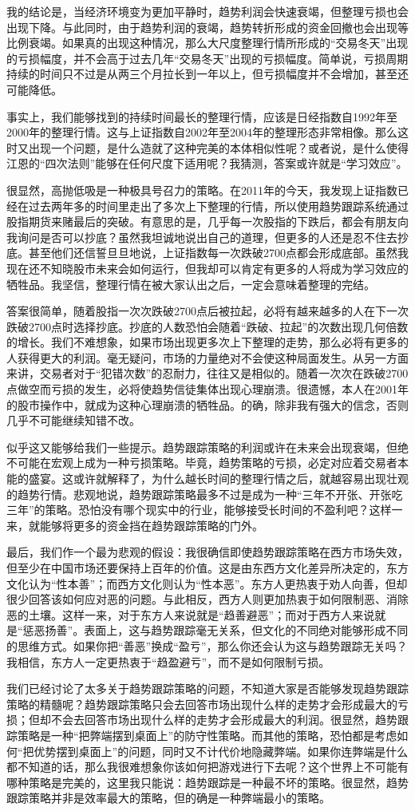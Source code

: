 我的结论是，当经济环境变为更加平静时，趋势利润会快速衰竭，但整理亏损也会出现下降。与此同时，由于趋势利润的衰竭，趋势转折形成的资金回撤也会出现等比例衰竭。如果真的出现这种情况，那么大尺度整理行情所形成的“交易冬天”出现的亏损幅度，并不会高于过去几年“交易冬天”出现的亏损幅度。简单说，亏损周期持续的时间只不过是从两三个月拉长到一年以上，但亏损幅度并不会增加，甚至还可能降低。

事实上，我们能够找到的持续时间最长的整理行情，应该是日经指数自1992年至2000年的整理行情。这与上证指数自2002年至2004年的整理形态非常相像。那么这时又出现一个问题，是什么造就了这种完美的本体相似性呢？或者说，是什么使得江恩的“四次法则”能够在任何尺度下适用呢？我猜测，答案或许就是“学习效应”。

很显然，高抛低吸是一种极具号召力的策略。在2011年的今天，我发现上证指数已经在过去两年多的时间里走出了多次上下整理的行情，所以使用趋势跟踪系统通过股指期货来赌最后的突破。有意思的是，几乎每一次股指的下跌后，都会有朋友向我询问是否可以抄底？虽然我坦诚地说出自己的道理，但更多的人还是忍不住去抄底。甚至他们还信誓旦旦地说，上证指数每一次跌破2700点都会形成底部。虽然我现在还不知晓股市未来会如何运行，但我却可以肯定有更多的人将成为学习效应的牺牲品。我坚信，整理行情在被大家认出之后，一定会意味着整理的完结。

答案很简单，随着股指一次次跌破2700点后被拉起，必将有越来越多的人在下一次跌破2700点时选择抄底。抄底的人数恐怕会随着“跌破、拉起”的次数出现几何倍数的增长。我们不难想象，如果市场出现更多次上下整理的走势，那么必将有更多的人获得更大的利润。毫无疑问，市场的力量绝对不会使这种局面发生。从另一方面来讲，交易者对于“犯错次数”的忍耐力，往往又是相似的。随着一次次在跌破2700点做空而亏损的发生，必将使趋势信徒集体出现心理崩溃。很遗憾，本人在2001年的股市操作中，就成为这种心理崩溃的牺牲品。的确，除非我有强大的信念，否则几乎不可能继续知错不改。

似乎这又能够给我们一些提示。趋势跟踪策略的利润或许在未来会出现衰竭，但绝不可能在宏观上成为一种亏损策略。毕竟，趋势策略的亏损，必定对应着交易者本能的盛宴。这或许就解释了，为什么越长时间的整理行情之后，就越容易出现壮观的趋势行情。悲观地说，趋势跟踪策略最多不过是成为一种“三年不开张、开张吃三年”的策略。恐怕没有哪个现实中的行业，能够接受长时间的不盈利吧？这样一来，就能够将更多的资金挡在趋势跟踪策略的门外。

最后，我们作一个最为悲观的假设：我很确信即使趋势跟踪策略在西方市场失效，但至少在中国市场还要保持上百年的价值。这是由东西方文化差异所决定的，东方文化认为“性本善”；而西方文化则认为“性本恶”。东方人更热衷于劝人向善，但却很少回答该如何应对恶的问题。与此相反，西方人则更加热衷于如何限制恶、消除恶的土壤。这样一来，对于东方人来说就是“趋善避恶”；而对于西方人来说就是“惩恶扬善”。表面上，这与趋势跟踪毫无关系，但文化的不同绝对能够形成不同的思维方式。如果你把“善恶”换成“盈亏”，那么你还会认为这与趋势跟踪无关吗？我相信，东方人一定更热衷于“趋盈避亏”，而不是如何限制亏损。

我们已经讨论了太多关于趋势跟踪策略的问题，不知道大家是否能够发现趋势跟踪策略的精髓呢？趋势跟踪策略只会去回答市场出现什么样的走势才会形成最大的亏损；但却不会去回答市场出现什么样的走势才会形成最大的利润。很显然，趋势跟踪策略是一种“把弊端摆到桌面上”的防守性策略。而其他的策略，恐怕都是考虑如何“把优势摆到桌面上”的问题，同时又不计代价地隐藏弊端。如果你连弊端是什么都不知道的话，那么我很难想象你该如何把游戏进行下去呢？这个世界上不可能有哪种策略是完美的，这里我只能说：趋势跟踪是一种最不坏的策略。很显然，趋势跟踪策略并非是效率最大的策略，但的确是一种弊端最小的策略。

\clearpage
